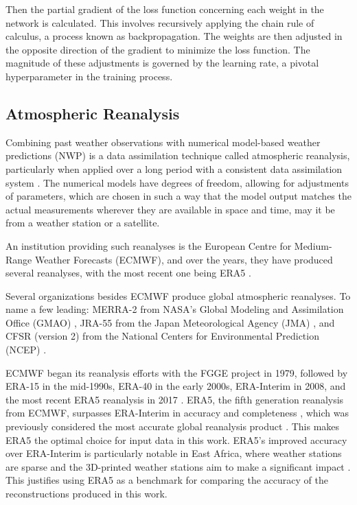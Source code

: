 Then the partial gradient of the loss function concerning each weight in the network is calculated.
This involves recursively applying the chain rule of calculus, a process known as backpropagation. The weights are then adjusted in the opposite direction of the gradient to minimize the loss function.
The magnitude of these adjustments is governed by the learning rate, a pivotal hyperparameter in the training process. 

\newpage

\subsection{Atmospheric Reanalysis}
 
Combining past weather observations with numerical model-based weather predictions (NWP)
is a data assimilation technique called atmospheric reanalysis, particularly when applied over a long period with a consistent data assimilation system \cite{Poli2016ERA20C, ECMWF2020dataassimilation}. The numerical models have degrees of freedom, allowing for adjustments of parameters, which are chosen in such a way that the model output matches the actual measurements wherever they are available in space and time, may it be from a weather station or a satellite.

An institution providing such reanalyses is the European Centre for Medium-Range Weather Forecasts (ECMWF), and over the years, they have produced several reanalyses, with the most recent one being ERA5 \cite{Hersbach2020ERA5quality}.

Several organizations besides ECMWF produce global atmospheric reanalyses. To name a few leading: MERRA-2 from NASA's Global Modeling and Assimilation Office (GMAO) \cite{Gelaro2017}, JRA-55 from the Japan Meteorological Agency (JMA) \cite{Kobayashi2015}, and CFSR (version 2) from the National Centers for Environmental Prediction (NCEP) \cite{Saha2014}.

ECMWF began its reanalysis efforts with the FGGE project in 1979, followed by ERA-15 in the mid-1990s, ERA-40 in the early 2000s, ERA-Interim in 2008, and the most recent ERA5 reanalysis in 2017 \cite{Hersbach2020ERA5quality}. ERA5, the fifth generation reanalysis from ECMWF, surpasses ERA-Interim in accuracy and completeness \cite{Hersbach2020ERA5quality}, which was previously considered the most accurate global reanalysis product \cite{Beck2019interimWasBest}. This makes ERA5 the optimal choice for input data in this work. ERA5's improved accuracy over ERA-Interim is particularly notable in East Africa, where weather stations are sparse and the 3D-printed weather stations aim to make a significant impact \cite{Gleixner2020ERA5africa}. This justifies using ERA5 as a benchmark for comparing the accuracy of the reconstructions produced in this work.

